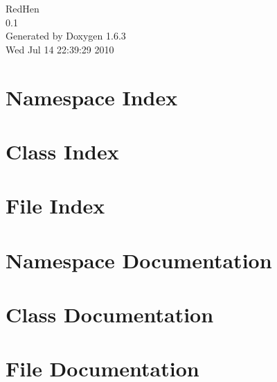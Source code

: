 \documentclass[a4paper]{book}
\begin{document}
\hypersetup{pageanchor=false}
\begin{titlepage}
\vspace*{7cm}
\begin{center}
{\Large RedHen \\[1ex]\large 0.1 }\\
\vspace*{1cm}
{\large Generated by Doxygen 1.6.3}\\
\vspace*{0.5cm}
{\small Wed Jul 14 22:39:29 2010}\\
\end{center}
\end{titlepage}
\clearemptydoublepage
{}
\tableofcontents
\clearemptydoublepage
{}
\hypersetup{pageanchor=true}
\chapter{Namespace Index}

\chapter{Class Index}

\chapter{File Index}

\chapter{Namespace Documentation}




\chapter{Class Documentation}








\chapter{File Documentation}




\printindex
\end{document}
